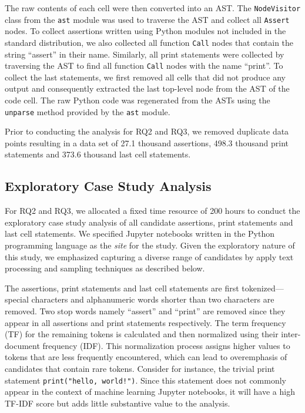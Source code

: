 \documentclass[smallextended]{svjour3}       %
\begin{document}
The raw contents of each cell were then converted into an AST. The \lstinline{NodeVisitor} class from the \lstinline{ast} module was used to traverse the AST and collect all \lstinline{Assert} nodes. To collect assertions written using Python modules not included in the standard distribution, we also collected all function \lstinline{Call} nodes that contain the string ``assert'' in their name. Similarly, all print statements were collected by traversing the AST to find all function \lstinline{Call} nodes with the name ``print''. To collect the last statements, we first removed all cells that did not produce any output and consequently extracted the last top-level node from the AST of the code cell. The raw Python code was regenerated from the ASTs using the \lstinline{unparse} method provided by the \lstinline{ast} module.

Prior to conducting the analysis for RQ2 and RQ3, we removed duplicate data points resulting in a data set of 27.1 thousand assertions, 498.3 thousand print statements and 373.6 thousand last cell statements.

\subsection{Exploratory Case Study Analysis}

For RQ2 and RQ3, we allocated a fixed time resource of 200 hours to conduct the exploratory case study analysis of all candidate assertions, print statements and last cell statements. We specified Jupyter notebooks written in the Python programming language as the \emph{site} for the study. Given the exploratory nature of this study, we emphasized capturing a diverse range of candidates by apply text processing and sampling techniques as described below.

The assertions, print statements and last cell statements are first tokenized---special characters and alphanumeric words shorter than two characters are removed. Two stop words namely ``assert'' and ``print'' are removed since they appear in all assertions and print statements respectively. The term frequency (TF) for the remaining tokens is calculated and then normalized using their inter-document frequency (IDF). This normalization process assigns higher values to tokens that are less frequently encountered, which can lead to overemphasis of candidates that contain rare tokens. Consider for instance, the trivial print statement \lstinline{print("hello, world!")}. Since this statement does not commonly appear in the context of machine learning Jupyter notebooks, it will have a high TF-IDF score but adds little substantive value to the analysis.
\end{document}
